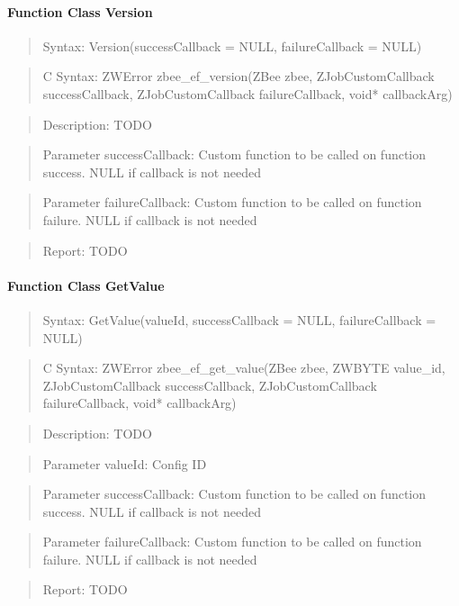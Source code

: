 
\paragraph{Function Class Version}
\begin{quote}Syntax: Version(successCallback = NULL, failureCallback = NULL)\end{quote}
\begin{quote}C Syntax: ZWError zbee\_ef\_version(ZBee zbee, ZJobCustomCallback successCallback, ZJobCustomCallback failureCallback, void* callbackArg)\end{quote}
\begin{quote}Description: TODO\end{quote}
\begin{quote}Parameter successCallback: Custom function to be called on function success. NULL if callback is not needed\end{quote}
\begin{quote}Parameter failureCallback: Custom function to be called on function failure. NULL if callback is not needed\end{quote}
\begin{quote}Report: TODO\end{quote}

\paragraph{Function Class GetValue}
\begin{quote}Syntax: GetValue(valueId, successCallback = NULL, failureCallback = NULL)\end{quote}
\begin{quote}C Syntax: ZWError zbee\_ef\_get\_value(ZBee zbee, ZWBYTE value\_id, ZJobCustomCallback successCallback, ZJobCustomCallback failureCallback, void* callbackArg)\end{quote}
\begin{quote}Description: TODO\end{quote}
\begin{quote}Parameter valueId: Config ID\end{quote}
\begin{quote}Parameter successCallback: Custom function to be called on function success. NULL if callback is not needed\end{quote}
\begin{quote}Parameter failureCallback: Custom function to be called on function failure. NULL if callback is not needed\end{quote}
\begin{quote}Report: TODO\end{quote}

